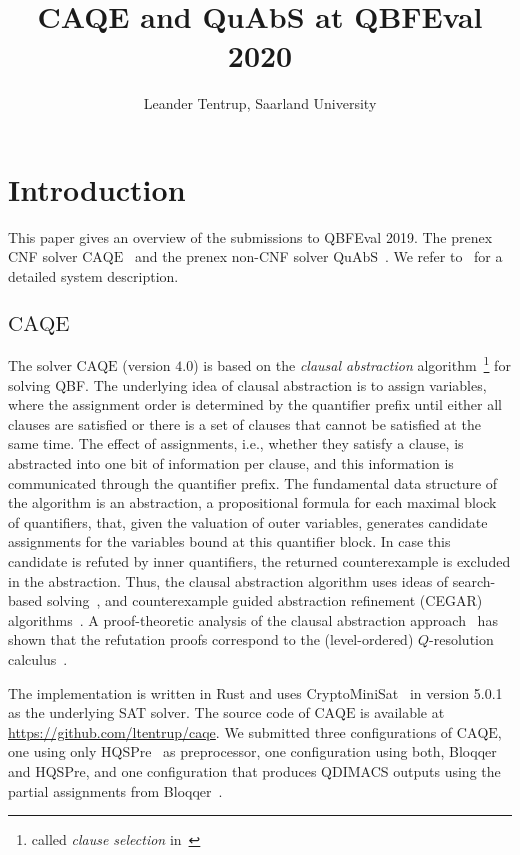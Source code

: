 \documentclass[11pt,twocolumn]{article}
\title{CAQE and QuAbS at QBFEval 2020}
\author{Leander Tentrup, Saarland University}
\date{}
\newcommand{\caqe}{\text{CAQE}}
\newcommand{\quabs}{\text{QuAbS}}
\begin{document}
\maketitle
  
\section{Introduction}

This paper gives an overview of the submissions to QBFEval 2019.
The prenex CNF solver $\caqe$~\cite{conf/fmcad/RabeT15} and the prenex non-CNF solver $\quabs$~\cite{journals/corr/Tentrup16}.
We refer to~\cite{journals/jsat/Tentrup19} for a detailed system description.


\subsection{$\caqe$}

The solver $\caqe$ (version $4.0$) is based on the \emph{clausal abstraction} algorithm~\cite{conf/fmcad/RabeT15,conf/ijcai/JanotaM15}\footnote{called \emph{clause selection} in~\cite{conf/ijcai/JanotaM15}} for solving QBF.
The underlying idea of clausal abstraction is to assign variables, where the assignment order is determined by the quantifier prefix until either all clauses are satisfied or there is a set of clauses that cannot be satisfied at the same time.
The effect of assignments, i.e., whether they satisfy a clause, is abstracted into one bit of information per clause, and this information is communicated through the quantifier prefix.
The fundamental data structure of the algorithm is an abstraction, a propositional formula for each maximal block of quantifiers, that, given the valuation of outer variables, generates candidate assignments for the variables bound at this quantifier block.
In case this candidate is refuted by inner quantifiers, the returned counterexample is excluded in the abstraction.
Thus, the clausal abstraction algorithm uses ideas of search-based solving~\cite{series/faia/GiunchigliaMN09}, and counterexample guided abstraction refinement (CEGAR) algorithms~\cite{conf/cav/ClarkeGJLV00}.
A proof-theoretic analysis of the clausal abstraction approach~\cite{conf/cav/Tentrup17} has shown that the refutation proofs correspond to the (level-ordered) $Q$-resolution calculus~\cite{journals/iandc/BuningKF95}.

The implementation is written in Rust and uses CryptoMiniSat~\cite{conf/sat/SoosNC09} in version 5.0.1 as the underlying SAT solver.
The source code of $\caqe$ is available at \url{https://github.com/ltentrup/caqe}.
We submitted three configurations of $\caqe$, one using only HQSPre~\cite{conf/tacas/WimmerRM017} as preprocessor, one configuration using both, Bloqqer~\cite{conf/cade/BiereLS11} and HQSPre, and one configuration that produces QDIMACS outputs using the partial assignments from Bloqqer~\cite{conf/date/SeidlK14}.
\end{document}
